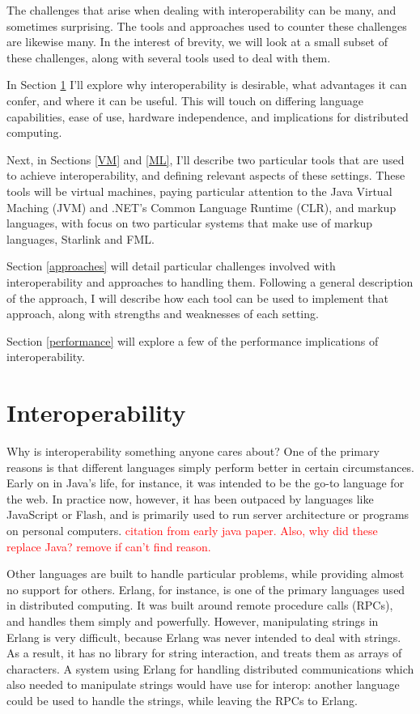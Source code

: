 \documentclass{sig-alternate}
\newcommand{\mycomment}[1]{\textcolor{red}{#1}}
\begin{document}
The challenges that arise when dealing with interoperability can be many, and sometimes surprising. The tools and approaches used to counter these challenges are likewise many. In the interest of brevity, we will look at a small subset of these challenges, along with several tools used to deal with them.

In Section \ref{Interop} I'll explore why interoperability is desirable, what advantages it can confer, and where it can be useful. This will touch on differing language capabilities, ease of use, hardware independence, and implications for distributed computing.

Next, in Sections \ref{VM} and \ref{ML}, I'll describe two particular tools that are used to achieve interoperability, and defining relevant aspects of these settings. These tools will be virtual machines, paying particular attention to the Java Virtual Maching (JVM) and .NET's Common Language Runtime (CLR), and markup languages, with focus on two particular systems that make use of markup languages, Starlink and FML.

Section \ref{approaches} will detail particular challenges involved with interoperability and approaches to handling them. Following a general description of the approach, I will describe how each tool can be used to implement that approach, along with strengths and weaknesses of each setting.

Section \ref{performance} will explore a few of the performance implications of interoperability.


\section{Interoperability}\label{Interop}
Why is interoperability something anyone cares about? One of the primary reasons is that different languages simply perform better in certain circumstances. Early on in Java's life, for instance, it was intended to be the go-to language for the web. In practice now, however, it has been outpaced by languages like JavaScript or Flash, and is primarily used to run server architecture or programs on personal computers. \mycomment{citation from early java paper. Also, why did these replace Java? remove if can't find reason.}



Other languages are built to handle particular problems, while providing almost no support for others. Erlang, for instance, is one of the primary languages used in distributed computing. It was built around remote procedure calls (RPCs), and handles them simply and powerfully. However, manipulating strings in Erlang is very difficult, because Erlang was never intended to deal with strings. As a result, it has no library for string interaction, and treats them as arrays of characters. A system using Erlang for handling distributed communications which also needed to manipulate strings would have use for interop: another language could be used to handle the strings, while leaving the RPCs to Erlang.
\end{document}
